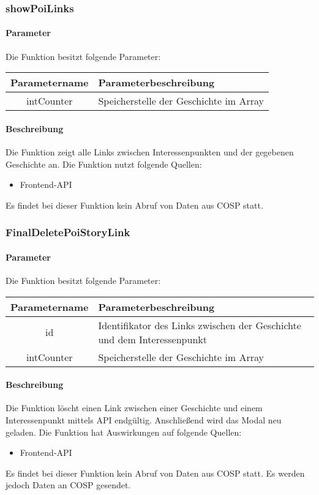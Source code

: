 \subsubsection{showPoiLinks}
\paragraph{Parameter} Die Funktion besitzt folgende Parameter:
\begin{table}[H]
	\begin{tabular}{|c|p{11cm}|}
		\hline
		\textbf{Parametername} & \textbf{Parameterbeschreibung} \\ \hline
		intCounter & Speicherstelle der Geschichte im Array \\ \hline
	\end{tabular}
\end{table}
\paragraph{Beschreibung} Die Funktion zeigt alle Links zwischen Interessenpunkten und der gegebenen Geschichte an. Die Funktion nutzt folgende Quellen:
\begin{itemize}
	\item Frontend-API
\end{itemize}
Es findet bei dieser Funktion kein Abruf von Daten aus {\glqq COSP\grqq} statt.
\subsubsection{FinalDeletePoiStoryLink}
\paragraph{Parameter} Die Funktion besitzt folgende Parameter:
\begin{table}[H]
	\begin{tabular}{|c|p{11cm}|}
		\hline
		\textbf{Parametername} & \textbf{Parameterbeschreibung} \\ \hline
		id         & Identifikator des Links zwischen der Geschichte und dem Interessenpunkt \\ \hline
		intCounter & Speicherstelle der Geschichte im Array \\ \hline
	\end{tabular}
\end{table}
\paragraph{Beschreibung} Die Funktion löscht einen Link zwischen einer Geschichte und einem Interessenpunkt mittels API endgültig. Anschließend wird das Modal neu geladen. Die Funktion hat Auswirkungen auf folgende Quellen:
\begin{itemize}
	\item Frontend-API
\end{itemize}
Es findet bei dieser Funktion kein Abruf von Daten aus {\glqq COSP\grqq} statt. Es werden jedoch Daten an {\glqq COSP\grqq} gesendet.
